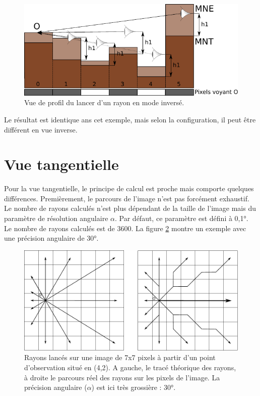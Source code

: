 \documentclass{report}
\begin{document}
\begin{figure}[H]
	\includegraphics{img/ray_side_inverse-fr.pdf} 
	\caption{Vue de profil du lancer d'un rayon en mode inversé.}
	\label{ray_side_inverse}
\end{figure}

Le résultat est identique ans cet exemple, mais selon la configuration, il peut être différent en vue inverse.

\section{Vue tangentielle}
\label{principles_tan}
Pour la vue tangentielle, le principe de calcul est proche mais comporte quelques différences. Premièrement, le parcours de l'image n'est pas forcément exhaustif. Le nombre de rayons calculés n'est plus dépendant de la taille de l'image mais du paramètre de résolution angulaire $\alpha$. Par défaut, ce paramètre est défini à 0,1°. Le nombre de rayons calculés est de 3600. La figure \ref{grid_tan} montre un exemple avec une précision angulaire de 30°.

\begin{figure}[H]
	\includegraphics[scale=0.8]{img/grid_tan.pdf} 
	\caption{Rayons lancés sur une image de 7x7 pixels à partir d'un point d'observation situé en (4,2). A gauche, le tracé théorique des rayons, à droite le parcours réel des rayons sur les pixels de l'image. La précision angulaire ($\alpha$) est ici très grossière : 30°.}
	\label{grid_tan}
\end{figure}
\end{document}
